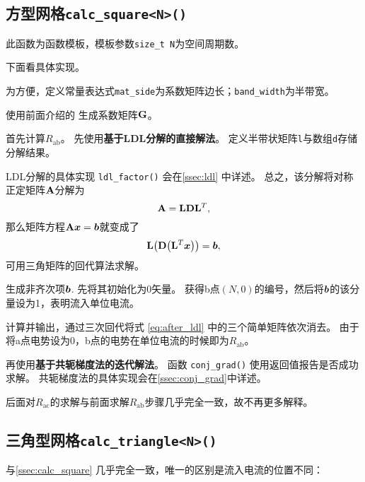 \subsection{方型网格\texttt{calc\_square<N>()}}
\label{ssec:calc_square}
此函数为函数模板，模板参数\verb|size_t N|为空间周期数。
{
    \linespread{1.0}
    
}

下面看具体实现。
{
    \linespread{1.0}
    
}
为方便，定义常量表达式\verb|mat_side|为系数矩阵边长；\verb|band_width|为半带宽。
{
    \linespread{1.0}
    
}
使用前面介绍的  生成系数矩阵$\vb{G}$。
{
    \linespread{1.0}
    
}
首先计算$R_\text{ab}$。
先使用\textbf{基于LDL分解的直接解法}。
定义半带状矩阵\verb|l|与数组\verb|d|存储分解结果。

LDL分解的具体实现 \verb|ldl_factor()| 会在\autoref{ssec:ldl} 中详述。
总之，该分解将对称正定矩阵$\vb{A}$分解为
\begin{equation}\label{eq:ldl}
    \vb{A} = \vb{L}\vb{D}\vb{L}^T,
\end{equation}
那么矩阵方程$\vb{A}\vb*{x}=\vb*{b}$就变成了
\begin{equation}\label{eq:after_ldl}
    \vb{L}\qty(\vb{D}\qty(\vb{L}^T\vb*{x})) = \vb*{b},
\end{equation}
可用三角矩阵的回代算法求解。
{
    \linespread{1.0}
    
}
生成非齐次项$\vb*{b}$.
先将其初始化为0矢量。
获得b点$(N,0)$的编号，然后将$\vb*{b}$的该分量设为1，表明流入单位电流。
{
    \linespread{1.0}
    
}
计算并输出，通过三次回代将式 \eqref{eq:after_ldl} 中的三个简单矩阵依次消去。
由于将a点电势设为0，b点的电势在单位电流的时候即为$R_\text{ab}$。
{
    \linespread{1.0}
    
}
再使用\textbf{基于共轭梯度法的迭代解法}。
函数 \verb|conj_grad()| 使用返回值报告是否成功求解。
共轭梯度法的具体实现会在\autoref{ssec:conj_grad}中详述。
{
    \linespread{1.0}
    
}
后面对$R_\text{ac}$的求解与前面求解$R_\text{ab}$步骤几乎完全一致，故不再更多解释。

\subsection{三角型网格\texttt{calc\_triangle<N>()}}
与\autoref{ssec:calc_square} 几乎完全一致，唯一的区别是流入电流的位置不同：
{
    \linespread{1.0}
    
}

